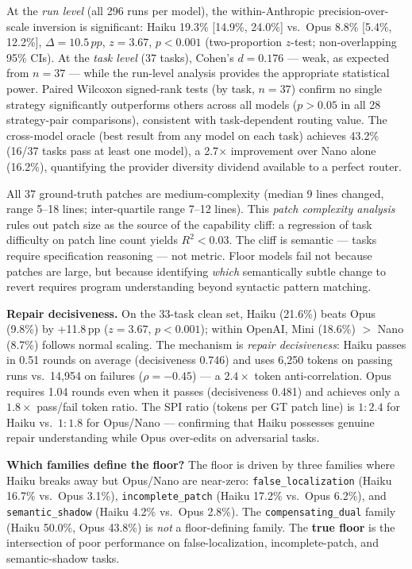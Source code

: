 \documentclass[sigconf,review,anonymous]{acmart}
\newcommand{\pp}{\,pp}
\begin{document}
At the \emph{run level} (all 296 runs per model), the within-Anthropic precision-over-scale inversion is
significant: Haiku 19.3\% [14.9\%, 24.0\%] vs.\ Opus 8.8\% [5.4\%, 12.2\%],
$\Delta=10.5\pp{}$, $z=3.67$, $p<0.001$ (two-proportion $z$-test; non-overlapping 95\%
CIs). At the \emph{task level} (37 tasks), Cohen's $d=0.176$ — weak, as expected
from $n=37$ — while the run-level analysis provides the appropriate statistical
power. Paired Wilcoxon signed-rank tests (by task, $n=37$) confirm no single
strategy significantly outperforms others across all models ($p>0.05$ in all 28
strategy-pair comparisons), consistent with task-dependent routing value. The
cross-model oracle (best result from any model on each task) achieves 43.2\% (16/37 tasks pass at least one model), a 2.7$\times$ improvement over Nano alone (16.2\%), quantifying the provider diversity dividend available to a perfect router.

All 37 ground-truth patches are medium-complexity (median 9 lines changed,
range 5--18 lines; inter-quartile range 7--12 lines). This \emph{patch
complexity analysis} rules out patch size as the source of the capability cliff:
a regression of task difficulty on patch line count yields $R^2 < 0.03$.
The cliff is semantic — tasks require specification reasoning — not metric.
Floor models fail not because patches are large, but because identifying
\emph{which} semantically subtle change to revert requires program understanding
beyond syntactic pattern matching.

\textbf{Repair decisiveness.}
On the 33-task clean set, Haiku (21.6\%) beats Opus (9.8\%) by +11.8\pp{} ($z=3.67$, $p<0.001$); within OpenAI, Mini (18.6\%) $>$ Nano (8.7\%) follows normal scaling.
The mechanism is \emph{repair decisiveness}: Haiku passes in 0.51 rounds on average (decisiveness 0.746) and uses 6{,}250 tokens on passing runs vs.\ 14{,}954 on failures ($\rho=-0.45$) — a $2.4\times$ token anti-correlation. Opus requires 1.04 rounds even when it passes (decisiveness 0.481) and achieves only a $1.8\times$ pass/fail token ratio. The SPI ratio (tokens per GT patch line) is $1:2.4$ for Haiku vs.\ $1:1.8$ for Opus/Nano — confirming that Haiku possesses genuine repair understanding while Opus over-edits on adversarial tasks.

\textbf{Which families define the floor?}
The floor is driven by three families where Haiku breaks away but Opus/Nano are near-zero: \texttt{false\_localization} (Haiku 16.7\% vs.\ Opus 3.1\%), \texttt{incomplete\_patch} (Haiku 17.2\% vs.\ Opus 6.2\%), and \texttt{semantic\_shadow} (Haiku 4.2\% vs.\ Opus 2.8\%). The \texttt{compensating\_dual} family (Haiku 50.0\%, Opus 43.8\%) is \emph{not} a floor-defining family. The \textbf{true floor} is the intersection of poor performance on false-localization, incomplete-patch, and semantic-shadow tasks.
\end{document}
